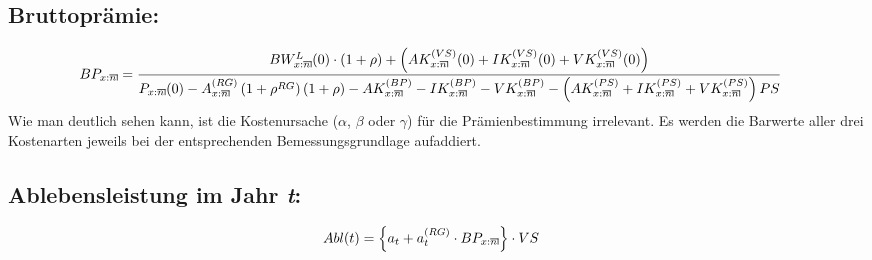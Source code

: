 \documentclass[a4paper,10pt]{article}
\makeatletter
\newcommand{\xn}{{\act[x]{n}}}
\DeclareRobustCommand{\act}[2][]{%
\def\arraystretch{0}%
\setlength\arraycolsep{0.5pt}%
\setlength\arrayrulewidth{0.5pt}%
\setbox0=\hbox{$\scriptstyle#1\ifx#1\empty{asdf}\else:\fi#2$}%
\begin{array}[b]{*2{@{}>{\scriptstyle}c}|}
\cline{2-2}%
\rule[1.25pt]{0pt}{\ht0}%
#1\ifx#1\empty\else:\fi & #2%
\end{array}%
}
\makeatother
\begin{document}
\subsection{Bruttoprämie:}
\begin{align*}
BP_\xn &= \frac%
{ 
   BW^L_\xn(0)\cdot\left(1+\rho\right) + 
   \left( AK^{(VS)}_\xn(0) + IK^{(VS)}_\xn(0) + VK^{(VS)}_\xn(0) \right)
}%
{
   P_\xn(0) - 
   A^{(RG)}_\xn \left(1+\rho^{RG}\right) \left(1+\rho\right) - 
         AK^{(BP)}_\xn - IK^{(BP)}_\xn - VK^{(BP)}_\xn - 
   \left(AK^{(PS)}_\xn + IK^{(PS)}_\xn + VK^{(PS)}_\xn\right) PS
}
\end{align*}
Wie man deutlich sehen kann, ist die Kostenursache ($\alpha$, $\beta$ oder $\gamma$) für die Prämienbestimmung irrelevant. Es werden die Barwerte aller drei Kostenarten jeweils bei der entsprechenden Bemessungsgrundlage aufaddiert.

% 
\subsection{Ablebensleistung im Jahr \textit{t}:}
\begin{align*}
Abl(t) &= \left\{a_t + a^{(RG)}_t \cdot BP_\xn\right\} \cdot VS
\end{align*}
\end{document}
